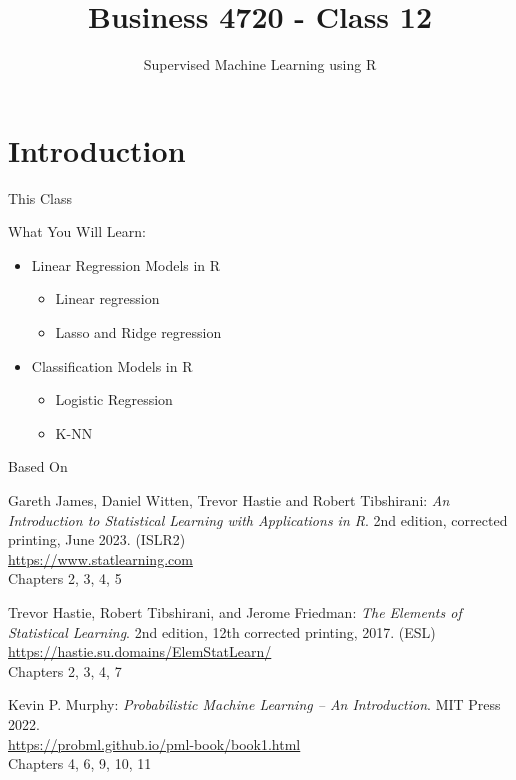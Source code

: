 \documentclass[ignorenonframetext,xcolor=x11names]{beamer}
\title{Business 4720 - Class 12}
\subtitle{Supervised Machine Learning using R}
\begin{document}
\begin{frame}{}
  \titlepage
  \footnotesize
  
\end{frame}

\section{Introduction}

\begin{frame}{This Class}

\begin{block}{What You Will Learn:}
\begin{itemize}
  \item Linear Regression Models in R
  \begin{itemize}
     \item Linear regression
     \item Lasso and Ridge regression
  \end{itemize}
  \item Classification Models in R
  \begin{itemize}
    \item Logistic Regression
    \item K-NN
  \end{itemize}
\end{itemize}
\end{block}
\end{frame}

\begin{frame}{Based On}
\small
\begin{block}{}
Gareth James, Daniel Witten, Trevor Hastie and Robert Tibshirani: \emph{An Introduction to Statistical Learning with Applications in R}. 2nd edition, corrected printing, June 2023. (ISLR2) \\
\vspace{1mm}
\url{https://www.statlearning.com} \\
\vspace{1mm}
Chapters 2, 3, 4, 5
\end{block}

\begin{block}{}
Trevor Hastie, Robert Tibshirani, and Jerome Friedman: \emph{The Elements of Statistical Learning}. 2nd edition, 12th corrected printing, 2017. (ESL) \\
\vspace{1mm}
\url{https://hastie.su.domains/ElemStatLearn/} \\
\vspace{1mm}
Chapters 2, 3, 4, 7
\end{block}

\begin{block}{}
Kevin P. Murphy: \emph{Probabilistic Machine Learning -- An Introduction}. MIT Press 2022. \\
\vspace{1mm}
\url{https://probml.github.io/pml-book/book1.html} \\
\vspace{1mm}
Chapters 4, 6, 9, 10, 11
\end{block}
\end{frame}
\end{document}
